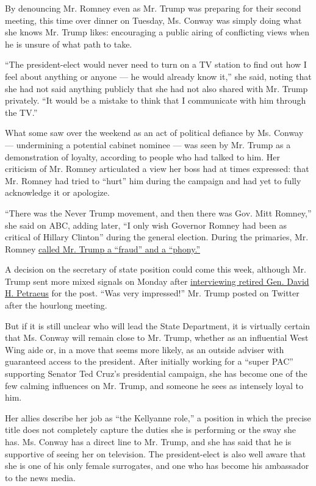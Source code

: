 By denouncing Mr. Romney even as Mr. Trump was preparing for their
second meeting, this time over dinner on Tuesday, Ms. Conway was simply
doing what she knows Mr. Trump likes: encouraging a public airing of
conflicting views when he is unsure of what path to take.

``The president-elect would never need to turn on a TV station to find
out how I feel about anything or anyone --- he would already know it,''
she said, noting that she had not said anything publicly that she had
not also shared with Mr. Trump privately. ``It would be a mistake to
think that I communicate with him through the TV.''

What some saw over the weekend as an act of political defiance by Ms.
Conway --- undermining a potential cabinet nominee --- was seen by Mr.
Trump as a demonstration of loyalty, according to people who had talked
to him. Her criticism of Mr. Romney articulated a view her boss had at
times expressed: that Mr. Romney had tried to ``hurt'' him during the
campaign and had yet to fully acknowledge it or apologize.

``There was the Never Trump movement, and then there was Gov. Mitt
Romney,'' she said on ABC, adding later, ``I only wish Governor Romney
had been as critical of Hillary Clinton'' during the general election.
During the primaries, Mr. Romney
\href{http://www.nytimes.com/2016/03/04/us/politics/mitt-romney-speech.html}{called
Mr. Trump a ``fraud'' and a ``phony.''}

A decision on the secretary of state position could come this week,
although Mr. Trump sent more mixed signals on Monday after
\href{http://www.nytimes.com/2016/11/28/us/politics/donald-trump-transition-david-petraeus.html}{interviewing
retired Gen. David H. Petraeus} for the post. ``Was very impressed!''
Mr. Trump posted on Twitter after the hourlong meeting.

But if it is still unclear who will lead the State Department, it is
virtually certain that Ms. Conway will remain close to Mr. Trump,
whether as an influential West Wing aide or, in a move that seems more
likely, as an outside adviser with guaranteed access to the president.
After initially working for a ``super PAC'' supporting Senator Ted
Cruz's presidential campaign, she has become one of the few calming
influences on Mr. Trump, and someone he sees as intensely loyal to him.

Her allies describe her job as ``the Kellyanne role,'' a position in
which the precise title does not completely capture the duties she is
performing or the sway she has. Ms. Conway has a direct line to Mr.
Trump, and she has said that he is supportive of seeing her on
television. The president-elect is also well aware that she is one of
his only female surrogates, and one who has become his ambassador to the
news media.

